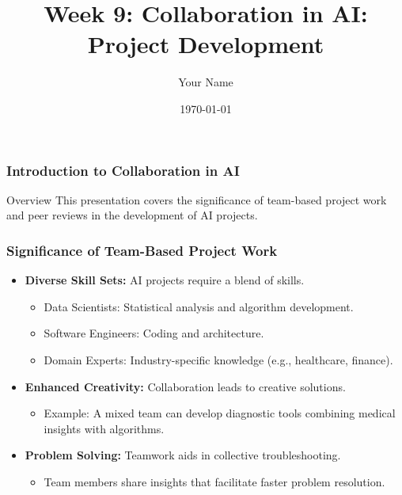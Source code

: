 \documentclass{beamer}
\title{Week 9: Collaboration in AI: Project Development}
\author{Your Name}
\institute{Your Institution}
\date{\today}
\begin{document}
\frame{\titlepage}

\begin{frame}[fragile]
    \frametitle{Introduction to Collaboration in AI}
    \begin{block}{Overview}
        This presentation covers the significance of team-based project work and peer reviews in the development of AI projects.
    \end{block}
\end{frame}

\begin{frame}[fragile]
    \frametitle{Significance of Team-Based Project Work}
    
    \begin{itemize}
        \item \textbf{Diverse Skill Sets:} AI projects require a blend of skills.
        \begin{itemize}
            \item Data Scientists: Statistical analysis and algorithm development.
            \item Software Engineers: Coding and architecture.
            \item Domain Experts: Industry-specific knowledge (e.g., healthcare, finance).
        \end{itemize}
        
        \item \textbf{Enhanced Creativity:} Collaboration leads to creative solutions.
        \begin{itemize}
            \item Example: A mixed team can develop diagnostic tools combining medical insights with algorithms.
        \end{itemize}
        
        \item \textbf{Problem Solving:} Teamwork aids in collective troubleshooting.
        \begin{itemize}
            \item Team members share insights that facilitate faster problem resolution.
        \end{itemize}
    \end{itemize}
\end{frame}
\end{document}
